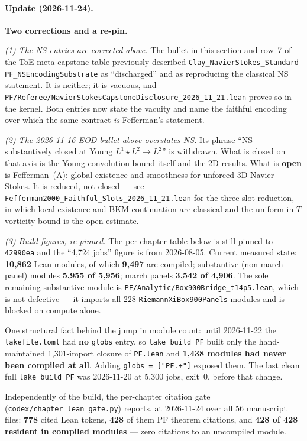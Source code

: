 \paragraph{Update (2026-11-24).} \textbf{Two corrections and a
re-pin.}

\emph{(1) The NS entries are corrected above.} The bullet in this section and
row~7 of the ToE meta-capstone table previously described
\texttt{Clay\_NavierStokes\_Standard PF\_NSEncodingSubstrate} as
``discharged'' and as reproducing the classical NS statement. It is neither;
it is vacuous, and
\texttt{PF/Referee/NavierStokesCapstoneDisclosure\_2026\_11\_21.lean} proves so
in the kernel. Both entries now state the vacuity and name the faithful
encoding over which the same contract \emph{is} Fefferman's statement.

\emph{(2) The 2026-11-16 EOD bullet above overstates NS.} Its phrase ``NS
substantively closed at Young $L^1 \star L^2 \to L^2$'' is withdrawn. What is
closed on that axis is the Young convolution bound itself and the 2D results.
What is \textbf{open} is Fefferman~(A): global existence and smoothness for
unforced 3D Navier--Stokes. It is reduced, not closed --- see
\texttt{Fefferman2000\_Faithful\_Slots\_2026\_11\_21.lean} for the three-slot
reduction, in which local existence and BKM continuation are classical and the
uniform-in-$T$ vorticity bound is the open estimate.

\emph{(3) Build figures, re-pinned.} The per-chapter table below is still
pinned to \texttt{42990ea} and the ``4{,}724 jobs'' figure is from 2026-08-05.
Current measured state: \textbf{10{,}862} Lean modules, of which
\textbf{9{,}497} are compiled; substantive (non-march-panel) modules
\textbf{5{,}955 of 5{,}956}; march panels \textbf{3{,}542 of 4{,}906}. The
sole remaining substantive module is
\texttt{PF/Analytic/Box900Bridge\_t14p5.lean}, which is not defective --- it
imports all 228 \texttt{RiemannXiBox900Panels} modules and is blocked on
compute alone.

One structural fact behind the jump in module count: until 2026-11-22 the
\texttt{lakefile.toml} had \textbf{no} \texttt{globs} entry, so
\texttt{lake build PF} built only the hand-maintained 1{,}301-import closure of
\texttt{PF.lean} and \textbf{1{,}438 modules had never been compiled at all}.
Adding \texttt{globs = ["PF.+"]} exposed them. The last clean full
\texttt{lake build PF} was 2026-11-20 at 5{,}300 jobs, exit~0, before that
change.

Independently of the build, the per-chapter citation gate
(\texttt{codex/chapter\_lean\_gate.py}) reports, at 2026-11-24 over all 56
manuscript files: \textbf{778} cited Lean tokens, \textbf{428} of them PF
theorem citations, and \textbf{428 of 428 resident in compiled modules} ---
zero citations to an uncompiled module.

